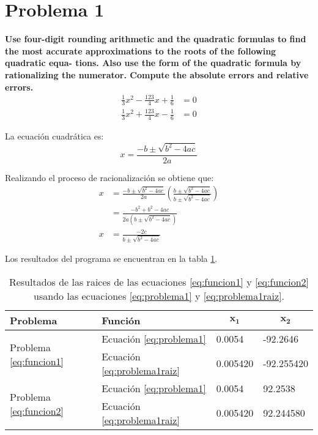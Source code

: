 \section*{Problema 1}
\textbf{Use four-digit rounding arithmetic and the quadratic formulas to find the
    most accurate approximations to the roots of the following quadratic equa-
    tions. Also use the form of the quadratic formula by rationalizing the
    numerator. Compute the absolute errors and relative errors.}
\begin{align}
    \frac{1}{3}x^2 - \frac{123}{4}x +\frac{1}{6} & = 0 \label{eq:funcion1} \\
    \frac{1}{3}x^2 + \frac{123}{4}x -\frac{1}{6} & = 0 \label{eq:funcion2}
\end{align}

La ecuación cuadrática es:
\begin{equation}
    x = \frac{-b\pm \sqrt{b^2-4ac}}{2a}
    \label{eq:problema1}
\end{equation}

Realizando el proceso de racionalización se obtiene que:
\begin{align}
    x & = \frac{-b\pm \sqrt{b^2-4ac}}{2a}\left(\frac{b\pm \sqrt{b^2-4ac}}{b\pm \sqrt{b^2-4ac}}\right) \nonumber \\
      & = \frac{-b^2+b^2-4ac}{2a(b\pm \sqrt{b^2-4ac})}                                   \nonumber              \\
    x & = \frac{-2c}{b\pm \sqrt{b^2-4ac}} \label{eq:problema1raiz}
\end{align}

Los resultados del programa se encuentran en la tabla \ref{table:resultados1}.
\begin{table}[H]
    \centering
    \begin{tabular}{llll} \hline
        \textbf{Problema}                           & \textbf{Función}                & \multicolumn{1}{c}{$\mathbf{x_1}$} & \multicolumn{1}{c}{$\mathbf{x_2}$} \\ \hline
        \multirow{2}{*}{Problema \ref{eq:funcion1}} & Ecuación \ref{eq:problema1}     & 0.0054                             & -92.2646                           \\
                                                    & Ecuación \ref{eq:problema1raiz} & 0.005420                           & -92.255420                         \\
        \multirow{2}{*}{Problema \ref{eq:funcion2}} & Ecuación \ref{eq:problema1}     & 0.0054                             & 92.2538                            \\
                                                    & Ecuación \ref{eq:problema1raiz} & 0.005420                           & 92.244580                          \\ \hline
    \end{tabular}
    \caption{Resultados de las raices de las ecuaciones \ref{eq:funcion1} y \ref{eq:funcion2} usando las ecuaciones \ref{eq:problema1} y \ref{eq:problema1raiz}.}
    \label{table:resultados1}
\end{table}

